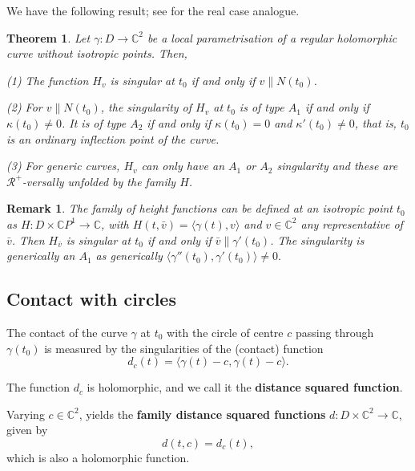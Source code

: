 \documentclass[12pt,a4paper]{article}
\newtheorem{theo}[prop]{Theorem}
\newtheorem{rem}[prop]{Remark}
\begin{document}
We have the following result; see \cite{BG} for the real case analogue. 

\begin{theo}
	Let $\gamma:D\to \mathbb C^2$ be a local  parametrisation of a regular holomorphic curve without isotropic points.
	Then,
	
	{\rm (1)} The function $H_v$ is singular at $t_0$ if and only if $v\parallel N(t_0)$.
	
	{\rm (2)} For $v\parallel  N(t_0)$, the singularity of $H_v$ at $t_0$ is of type $A_1$ if and only if $\kappa(t_0)\ne 0$.
	It is of type  $A_2$ if and only if $\kappa(t_0)=0$ and $\kappa'(t_0)\ne 0$, that is, $t_0$ is an ordinary inflection point of the curve.
	
	{\rm (3)} For generic curves, $H_v$ can only have an $A_1$ or $A_2$ singularity and these are $\mathcal R^+$-versally unfolded by the family $H$.
\end{theo}

\begin{rem}
{\rm 
The family of height functions can be defined at an isotropic point $t_0$ 
as $H:D\times \mathbb C P^1\to \mathbb C$, with $H(t,\bar{v})=\langle \gamma(t),{v}\rangle$ and $v\in \mathbb C^2$ any representative of $\bar{v}$. Then $H_{\bar{v}}$ is singular at $t_0$ if and only if $\bar{v}\parallel \gamma'(t_0)$. The singularity is generically an $A_1$ as generically $\langle \gamma''(t_0),\gamma'(t_0)\rangle\ne 0.$
}
\end{rem}

\subsection{Contact with circles}\label{ssec:contactCircles}

The contact of the curve $\gamma$ at $t_0$ with the circle of centre ${c}$ passing through $\gamma(t_0)$ is measured by the singularities of the (contact) function 
\begin{equation}
d_{c}(t)=\langle \gamma(t)-c, {\gamma(t)-c}\rangle. 
\end{equation}

The function $d_c$ is holomorphic, and we call it the {\bf distance squared function}. 

Varying $c\in \mathbb C^2$, yields the {\bf family distance squared functions}
$d:D\times  \mathbb C^2\to \mathbb C$, given by 
\begin{equation}
d(t,c)=d_c(t),
\end{equation}
which is also a holomorphic function.
\end{document}
